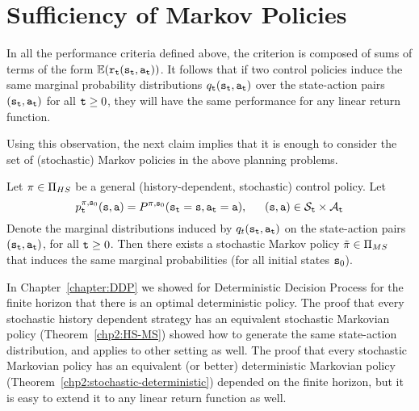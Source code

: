 \section{Sufficiency of Markov Policies}
In all the performance criteria defined above, the criterion is
composed of sums of terms of the form
$\mathbb{E}({{\tt r}_{\tt t}}({{\tt s}_{\tt t}},{{\tt a}_{\tt t}}))$. It follows
that if two control policies induce the same marginal probability
distributions ${q_{\tt t}}({{\tt s}_{\tt t}},{{\tt a}_{\tt t}})$ over
the state-action pairs $({{\tt s}_{\tt t}},{{\tt a}_{\tt t}})$ for all
${\tt t} \ge 0$, they will have the same performance for any linear
return function.

Using this observation, the next claim implies that it is enough to
consider the set of (stochastic) Markov policies in the above
planning problems.

\begin{proposition}\label{prop:sufficient} Let  $\pi  \in {\Pi _{HS}}$ be a general (history-dependent, stochastic) control policy.  Let
\[p_{\tt t}^{\pi ,{{\tt s}_0}}({\tt s},{\tt a}) = {P^{\pi ,{{\tt s}_0}}}({{\tt s}_{\tt t}} = {\tt s},{{\tt a}_{\tt t}} = {\tt a}),\quad \;\;({\tt s},{\tt a}) \in {\mathcal{S}_{\tt t}} \times {\mathcal{A}_{\tt t}}\]
Denote the marginal distributions induced by
$q_t({{\tt s}_{\tt t}},{{\tt a}_{\tt t}})$ on the state-action pairs
$({{\tt s}_{\tt t}},{{\tt a}_{\tt t}})$, for all ${\tt t} \ge 0$. Then there
exists a stochastic Markov policy $\tilde {\pi} \in {\Pi_{MS}}$
that induces the same marginal probabilities (for all initial states
${{\tt s}_0}$).
\end{proposition}


In Chapter~\ref{chapter:DDP}  we showed for Deterministic Decision
Process for the finite horizon that there is an optimal
deterministic policy. The proof that every stochastic history
dependent strategy has an equivalent stochastic Markovian policy
(Theorem~\ref{chp2:HS-MS}) showed how to generate the same
state-action distribution, and applies to other setting as well. The
proof that every stochastic Markovian policy has an equivalent (or better) deterministic
Markovian policy (Theorem~\ref{chp2:stochastic-deterministic})
depended on the finite horizon, but it is easy to extend it to any
linear return function as well.

